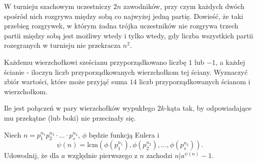 \documentclass{article}
\begin{document}
\begin{zadanie}
  W turnieju szachowym uczestniczy $2n$ zawodników, przy czym każdych dwóch spośród nich rozgrywa między sobą co najwyżej jedną partię. Dowieść, że taki przebieg rozgrywek, w którym żadna trójka uczestników nie rozgrywa trzech partii między sobą jest możliwy wtedy i tylko wtedy, gdy liczba wszystkich partii rozegranych w turnieju nie przekracza $n^2$.
\end{zadanie}


\begin{zadanie}
  Każdemu wierzchołkowi sześcianu przyporządkowano liczbę $1$ lub $-1$, a każdej ścianie - iloczyn liczb przyporządkowanych wierzchołkom tej ściany. Wyznaczyć zbiór wartości, które może przyjąć suma $14$ liczb przyporządkowanych ścianom i wierzchołkom.
\end{zadanie}


\begin{zadanie}
  Ile jest połączeń w pary wierzchołków wypukłego $2k$-kąta tak, by odpowiadające mu przekątne (lub boki) nie przecinały się.
\end{zadanie}


\begin{zadanie}
  Niech $n=p_1^{n_1}p_2^{n_2}\cdot\dots\cdot p_s^{n_2}$, $\phi$ będzie funkcją Eulera i 
  $$\psi(n)=\text{lcm}(\phi(p_1^{n_1}),\phi(p_2^{n_2}), ...,\phi(p_s^{n_2})).$$
  Udowodnij, że dla $a$ względnie pierwszego z $n$ zachodzi $n|a^{\psi(n)}-1$.
\end{zadanie}
\end{document}
